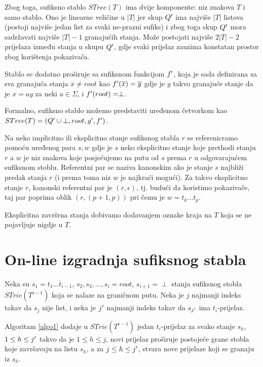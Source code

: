 \documentclass[times, utf8, seminar, numeric]{fer}
\begin{document}
	Zbog toga, sufiksno stablo $STree(T)$ ima dvije komponente: niz znakova $T$ i samo stablo. Ono je linearne veličine u $|T|$ jer skup $Q\rq{}$ ima najviše $|T|$ listova (postoji najviše jedan list za svaki ne-prazni sufiks) i zbog toga skup $Q\rq{}$ mora sadržavati najviše $|T| - 1$ granajućih stanja. Može postojati najviše $2|T| - 2$ prijelaza između stanja u skupu $Q\rq{}$, gdje svaki prijelaz zauzima konstatan prostor zbog korištenja pokazivača.
	
	Stablo se dodatno proširuje sa sufiksnom funkcijom $f\rq{}$, koja je sada definirana za sva granajuća stanja $\overline{x} \ne root$ kao $f\rq{}(\overline{x}) = \overline{y}$ gdje je $y$ takvo granajuće stanje da je $x = ay$ za neki $a \in \Sigma$, i $f\rq{}(root) = \perp$. 
	
	Formalno, sufiksno stablo možemo predstaviti uređenom četvorkom kao $STree(T) = (Q\rq{} \cup {\perp}, root, g\rq{}, f\rq{})$.
	
	Na neko implicitno ili eksplicitno stanje sufiksnog stabla $r$ se referenicramo pomoću uređenog para $s, w$ gdje je $s$ neko eksplicitno stanje koje prethodi stanju $r$ a $w$ je niz znakova koje posjećujemo na putu od $s$ prema $r$ u odgovarajućem sufiksnom stoblu. Referentni par  se naziva kanonskim  ako je stanje $s$ najbliži predak stanja $r$ (i prema toma niz $w$ je najkraći mogući). Za takvo eksplicitno stanje $r$, kanonski referentni par je $(r, \epsilon)$, tj. budući da koristimo pokazivače, taj par poprima oblik $(r, (p+1, p))$ pri čemu je $w = t_k ... t_p$.
	
	Eksplicitna završrna stanja dobivamo dodavanjem oznake kraja na $T$ koja se ne pojavljuje nigdje u $T$.

\section{On-line izgradnja sufiksnog stabla}

	Neka su $s_1 = \overline{t_1 ... t_{i-1}}$, $s_2, s_3, ..., s_i = root$, $s_{i+1} = \perp$ stanja sufiksnog stobla $STrie(T^{i-1})$ koja se nalaze na graničnom putu. Neka je $j$ najmanji indeks takav da $s_j$ nije list, i neka je $j\rq{}$ najmanji indeks takav da $s_{j\rq{}}$ ima $t_i$-prijelaz.
	
\begin{lema}
Algoritam \ref{algo1} dodaje u $STrie(T^{i-1})$ jedan $t_i$-prijelaz za svako stanje $s_h$, $1 \le h \le j\rq{}$ takvo da je $1 \le h \le j$, novi prijelaz proširuje postojeće grane stobla koje završavaju na listu $s_h$, a za $j \le h \le j\rq{}$, stvara nove prijelaze koji se granaju iz $s_h$.
\end{lema}
\end{document}
